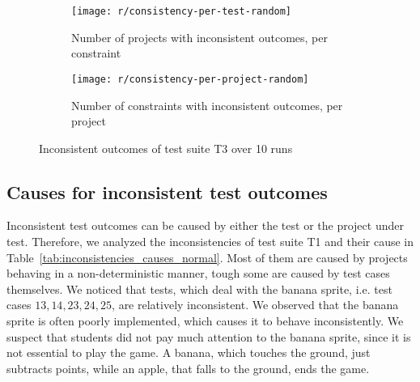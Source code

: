 \begin{figure}[htpb]
    \centering
    \begin{subfigure}{.75\textwidth}
        \texttt{[image: r/consistency-per-test-random]}%
        \vspace{-\medskipamount}
        \caption{Number of projects with inconsistent outcomes, per constraint}
        \label{fig:consistency_per_test_random}
    \end{subfigure}

    \bigskip

    \begin{subfigure}{.75\textwidth}
        \texttt{[image: r/consistency-per-project-random]}%
        \vspace{-\medskipamount}
        \caption{Number of constraints with inconsistent outcomes, per project}
        \label{fig:consistency_per_project_random}
    \end{subfigure}

    \caption{Inconsistent outcomes of test suite T3 over 10 runs}
    \label{fig:consistency_random}
\end{figure}

\subsection{Causes for inconsistent test outcomes}

Inconsistent test outcomes can be caused by either the test or the project under test.
Therefore, we analyzed the inconsistencies of test suite T1 and their cause in Table~\ref{tab:inconsistencies_causes_normal}.
Most of them are caused by projects behaving in a non-deterministic manner,
tough some are caused by test cases themselves.
We noticed that tests, which deal with the banana sprite, i.e. test cases $13, 14, 23, 24, 25$, are relatively inconsistent.
We observed that the banana sprite is often poorly implemented, which causes it to behave inconsistently.
We suspect that students did not pay much attention to the banana sprite, since it is not essential to play the game.
A banana, which touches the ground, just subtracts points, while an apple, that falls to the ground, ends the game.
\parspace

